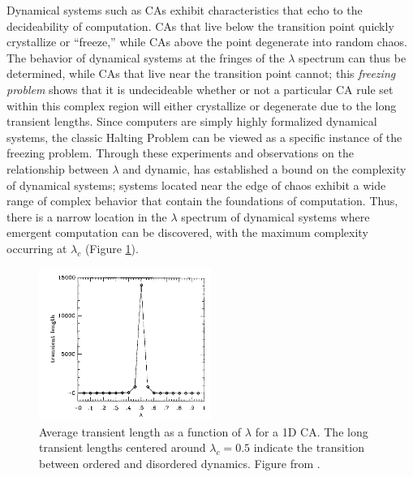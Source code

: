 \documentclass[a4paper,11pt,twoside]{report}
\begin{document}
Dynamical systems such as CAs exhibit characteristics that echo to the decideability of computation. CAs that live below the transition point quickly crystallize or ``freeze,'' while CAs above the point degenerate into random chaos. The behavior of dynamical systems at the fringes of the $\lambda$ spectrum can thus be determined, while CAs that live near the transition point cannot; this \textit{freezing problem} shows that it is undecideable whether or not a particular CA rule set within this complex region will either crystallize or degenerate due to the long transient lengths. Since computers are simply highly formalized dynamical systems, the classic Halting Problem can be viewed as a specific instance of the freezing problem. Through these experiments and observations on the relationship between $\lambda$ and dynamic, \citeauthor{la90} has established a bound on the complexity of dynamical systems; systems located near the edge of chaos exhibit a wide range of complex behavior that contain the foundations of computation. Thus, there is a narrow location in the $\lambda$ spectrum of dynamical systems where emergent computation can be discovered, with the maximum complexity occurring at $\lambda_c$ (Figure \ref{fig:lambda_trans}).

\begin{figure}[htp]
\centering
\includegraphics[width=0.5\textwidth]{la90_fig3_lambda_transient_len.png}
\caption[Lambda and Transient Length]{
Average transient length as a function of $\lambda$ for a 1D CA. The long transient lengths centered around $\lambda_c=0.5$ indicate the transition between ordered and disordered dynamics. Figure from \citeauthor{la90} \cite{la90}.
}
\label{fig:lambda_trans}
\end{figure}
\end{document}
